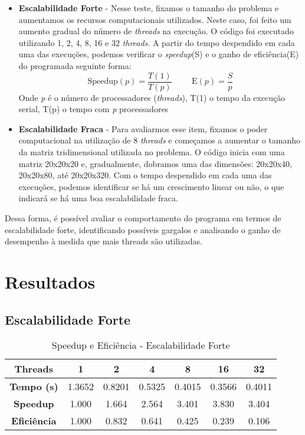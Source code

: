 \documentclass[a4paper, 12pt]{article}
\begin{document}
	\begin{itemize}
		\item \textbf{Escalabilidade Forte} - Nesse teste, fixamos o tamanho do problema e aumentamos os recursos computacionais utilizados. Neste caso, foi feito um aumento gradual do número de \textit{threads} na execução. O código foi executado utilizando 1, 2, 4, 8, 16 e 32 \textit{threads}. A partir do tempo despendido em cada uma das execuções, podemos verificar o \textit{speedup}(S) e o ganho de eficiência(E) do programada seguinte forma:
		\[
			\text{Speedup}(p) = \frac{T(1)}{T(p)}  \hspace{1cm} \text{E}(p) = \frac{S}{p}
		\]
		Onde \textit{p} é o número de processadores (\textit{threads}), T(1) o tempo da execução serial, T(p) o tempo com \textit{p} processadores
		
		\item \textbf{Escalabilidade Fraca} - Para avaliarmos esse item, fixamos o poder computacional na utilização de 8 \textit{threads} e começamos a aumentar o tamanho da matriz tridimensional utilizada no problema. O código inicia com uma matriz 20x20x20 e, gradualmente, dobramos uma das dimensões: 20x20x40, 20x20x80, até 20x20x320. Com o tempo despendido em cada uma das execuções, podemos identificar se há um crescimento linear ou não, o que indicará se há uma boa escalabilidade fraca.
	\end{itemize}
	
	 Dessa forma, é possível avaliar o comportamento do programa em termos de escalabilidade forte, identificando possíveis gargalos e analisando o ganho de desempenho à medida que mais threads são utilizadas.
	 
	 \section{Resultados}
	 \subsection{Escalabilidade Forte}	 
	 	\begin{table}[H]
	 	\centering
	 	\begin{tabular}{|c|c|c|c|c|c|c|}
	 		\hline
	 		\textbf{Threads} & 1 & 2 & 4 & 8 & 16 & 32 \\ \hline
	 		\textbf{Tempo (s)} & 1.3652 & 0.8201 & 0.5325 & 0.4015 & 0.3566 & 0.4011 \\ \hline
	 		\textbf{Speedup} & 1.000 & 1.664 & 2.564 & 3.401 & 3.830 & 3.404 \\ \hline
	 		\textbf{Eficiência} & 1.000 & 0.832 & 0.641 & 0.425 & 0.239 & 0.106 \\ \hline
	 	\end{tabular}
	 	\caption{Speedup e Eficiência - Escalabilidade Forte}
	 \end{table}
	 
\end{document}
